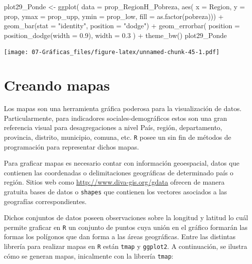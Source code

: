 \documentclass[
  12pt,
]{book}
\newenvironment{Shaded}{\begin{snugshade}}{\end{snugshade}}
\newcommand{\AttributeTok}[1]{\textcolor[rgb]{0.77,0.63,0.00}{#1}}
\newcommand{\FloatTok}[1]{\textcolor[rgb]{0.00,0.00,0.81}{#1}}
\newcommand{\FunctionTok}[1]{\textcolor[rgb]{0.00,0.00,0.00}{#1}}
\newcommand{\NormalTok}[1]{#1}
\newcommand{\OtherTok}[1]{\textcolor[rgb]{0.56,0.35,0.01}{#1}}
\newcommand{\SpecialCharTok}[1]{\textcolor[rgb]{0.00,0.00,0.00}{#1}}
\newcommand{\StringTok}[1]{\textcolor[rgb]{0.31,0.60,0.02}{#1}}
\begin{document}
\begin{Shaded}
\begin{Highlighting}[]
\NormalTok{plot29\_Ponde }\OtherTok{\textless{}{-}} \FunctionTok{ggplot}\NormalTok{(}
  \AttributeTok{data =}\NormalTok{ prop\_RegionH\_Pobreza,}
  \FunctionTok{aes}\NormalTok{(}
    \AttributeTok{x =}\NormalTok{ Region, }\AttributeTok{y =}\NormalTok{ prop,}
    \AttributeTok{ymax =}\NormalTok{ prop\_upp, }\AttributeTok{ymin =}\NormalTok{ prop\_low,}
    \AttributeTok{fill =} \FunctionTok{as.factor}\NormalTok{(pobreza))) }\SpecialCharTok{+}
  \FunctionTok{geom\_bar}\NormalTok{(}\AttributeTok{stat =} \StringTok{"identity"}\NormalTok{, }\AttributeTok{position =} \StringTok{"dodge"}\NormalTok{) }\SpecialCharTok{+}
  \FunctionTok{geom\_errorbar}\NormalTok{(}
    \AttributeTok{position =} \FunctionTok{position\_dodge}\NormalTok{(}\AttributeTok{width =} \FloatTok{0.9}\NormalTok{),}
    \AttributeTok{width =} \FloatTok{0.3}
\NormalTok{  ) }\SpecialCharTok{+}
  \FunctionTok{theme\_bw}\NormalTok{()}
\NormalTok{plot29\_Ponde}
\end{Highlighting}
\end{Shaded}

\texttt{[image: 07-Gráficas\_files/figure-latex/unnamed-chunk-45-1.pdf]}

\hypertarget{creando-mapas}{%
\section{Creando mapas}\label{creando-mapas}}

Los mapas son una herramienta gráfica poderosa para la visualización de datos. Particularmente, para indicadores sociales-demográficos estos son una gran referencia visual para desagregaciones a nivel País, región, departamento, provincia, distrito, municipio, comuna, etc. \texttt{R} posee un sin fin de métodos de programación para representar dichos mapas.

Para graficar mapas es necesario contar con información geoespacial, datos que contienen las coordenadas o delimitaciones geográficas de determinado país o región. Sitios web como \url{http://www.diva-gis.org/gdata} ofrecen de manera gratuita bases de datos o \texttt{shapes} que contienen los vectores asociados a las geografías correspondientes.

Dichos conjuntos de datos poseen observaciones sobre la longitud y latitud lo cuál permite graficar en \texttt{R} un conjunto de puntos cuya unión en el gráfico formarán las formas los polígonos que dan forma a las áreas geográficas. Entre las distintas librería para realizar mapas en \texttt{R} están \texttt{tmap} y \texttt{ggplot2}. A continuación, se ilustra cómo se generan mapas, inicalmente con la librería \texttt{tmap}:
\end{document}

